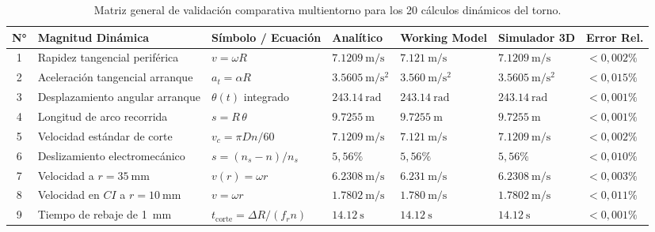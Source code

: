 \begin{table}[H]
\centering
\caption{Matriz general de validación comparativa multientorno para los 20 cálculos dinámicos del torno.}
\label{tab:matriz_validacion_completa}
\footnotesize
\setlength{\tabcolsep}{2.4pt}
\renewcommand{\arraystretch}{1.04}
\begin{tabularx}{\linewidth}{@{} c >{\raggedright\arraybackslash}X >{\centering\arraybackslash}p{2.5cm} >{\raggedleft\arraybackslash}p{1.9cm} >{\raggedleft\arraybackslash}p{1.9cm} >{\raggedleft\arraybackslash}p{1.9cm} >{\centering\arraybackslash}p{1.4cm} @{}}
\toprule
\textbf{N°} & \textbf{Magnitud Dinámica} & \textbf{Símbolo / Ecuación} & \textbf{Analítico} & \textbf{Working Model} & \textbf{Simulador 3D} & \textbf{Error Rel.} \\
\midrule
1 & Rapidez tangencial periférica & $v = \omega R$ & $\SI{7,1209}{\meter\per\second}$ & $\SI{7,121}{\meter\per\second}$ & $\SI{7,1209}{\meter\per\second}$ & $< 0{,}002\%$ \\
2 & Aceleración tangencial arranque & $a_t = \alpha R$ & $\SI{3,5605}{\meter\per\second\squared}$ & $\SI{3,560}{\meter\per\second\squared}$ & $\SI{3,5605}{\meter\per\second\squared}$ & $< 0{,}015\%$ \\
3 & Desplazamiento angular arranque & $\theta(t)$ integrado & $\SI{243,14}{\radian}$ & $\SI{243,14}{\radian}$ & $\SI{243,14}{\radian}$ & $< 0{,}001\%$ \\
4 & Longitud de arco recorrida & $s = R\,\theta$ & $\SI{9,7255}{\meter}$ & $\SI{9,7255}{\meter}$ & $\SI{9,7255}{\meter}$ & $< 0{,}001\%$ \\
5 & Velocidad estándar de corte & $v_c = \pi D n / 60$ & $\SI{7,1209}{\meter\per\second}$ & $\SI{7,121}{\meter\per\second}$ & $\SI{7,1209}{\meter\per\second}$ & $< 0{,}002\%$ \\
6 & Deslizamiento electromecánico & $s = (n_s - n)/n_s$ & $5{,}56\%$ & $5{,}56\%$ & $5{,}56\%$ & $< 0{,}010\%$ \\
7 & Velocidad a $r = \SI{35}{\milli\meter}$ & $v(r) = \omega r$ & $\SI{6,2308}{\meter\per\second}$ & $\SI{6,231}{\meter\per\second}$ & $\SI{6,2308}{\meter\per\second}$ & $< 0{,}003\%$ \\
8 & Velocidad en $CI$ a $r = \SI{10}{\milli\meter}$ & $v = \omega r$ & $\SI{1,7802}{\meter\per\second}$ & $\SI{1,780}{\meter\per\second}$ & $\SI{1,7802}{\meter\per\second}$ & $< 0{,}011\%$ \\
9 & Tiempo de rebaje de \SI{1}{\milli\meter} & $t_{\text{corte}} = \Delta R/(f_r n)$ & $\SI{14,12}{\second}$ & $\SI{14,12}{\second}$ & $\SI{14,12}{\second}$ & $< 0{,}001\%$ \\

\end{tabularx}
\end{table}
